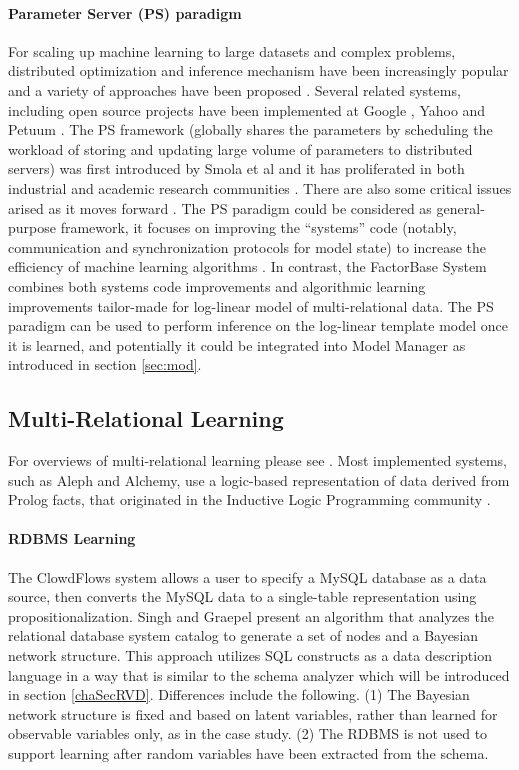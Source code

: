 \documentclass{sfuthesis}
\begin{document}
\paragraph{Parameter Server (PS) paradigm } %
For scaling up machine learning to large datasets and complex problems, distributed optimization and inference mechanism have been increasingly popular and a variety of approaches have been proposed \cite{Bekkerman2011}. Several related systems,  including open source projects have been implemented at Google \cite{Dean2012}, Yahoo \cite{Ahmed2012} and Petuum \cite{Ho2013}. The PS framework (globally shares the parameters by scheduling the workload of storing and updating large volume of parameters to distributed servers) was first introduced by Smola et al \cite{Smola2010} and it has proliferated in both industrial and academic research communities \cite{Li2014}. There are also some critical issues arised as it moves forward \cite{Nan2015}.
The PS paradigm could be considered as general-purpose framework, it focuses on improving the ``systems'' code (notably, communication and synchronization protocols for model state) to increase the efficiency of machine learning algorithms \cite{Dai2015}. 
In contrast, the FactorBase System combines both systems code improvements and algorithmic learning improvements tailor-made for log-linear model of multi-relational data.
The PS paradigm can be used to perform inference on the log-linear template model once it is learned, and potentially it could be integrated into Model Manager as introduced in section \ref{sec:mod}.

\subsection{Multi-Relational Learning} 
For overviews of multi-relational learning please see \cite{SRL2007,Domingos2009,Kimmig2015}. Most implemented systems, such as Aleph and Alchemy, use a logic-based representation of data derived from Prolog facts, that originated in the Inductive Logic Programming community \cite{Dzeroski2001c}. 

\paragraph{RDBMS Learning}
The ClowdFlows system \cite{Lavravc2014} allows a user to specify a MySQL database as a data source, then converts the MySQL data to a single-table representation using propositionalization. 
Singh and Graepel \cite{Singh2013} present an algorithm that analyzes the relational database system catalog to generate a set of nodes and a Bayesian network structure. 
This approach utilizes SQL constructs as a data description language in a way that is similar to the schema analyzer which will be introduced in section \ref{chaSecRVD}. 
Differences include the following. (1) The Bayesian network structure is fixed and based on latent variables, rather than learned for observable variables only, as in the case study. (2) The RDBMS is not used to support learning after random variables have been extracted from the schema. 
\end{document}
